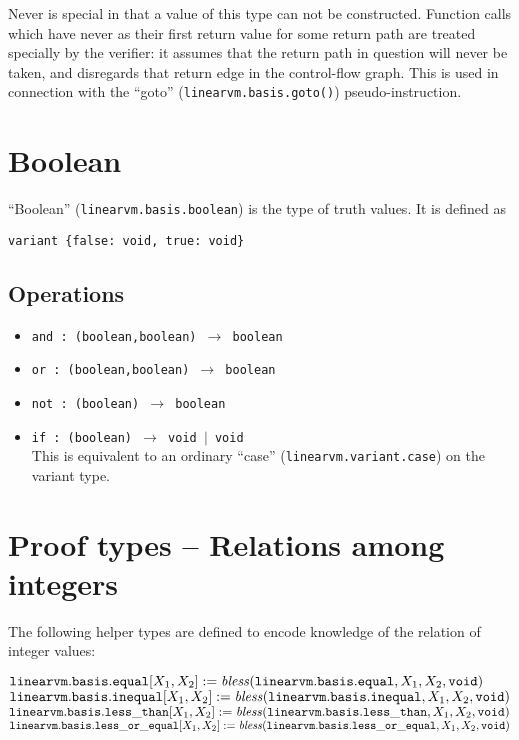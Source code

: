 \documentclass[a4paper]{book}
\newcommand\tyBless{{\ensuremath{\textnormal{\textit{bless}}}}}
\begin{document}
Never is special in that a value of this type can not be constructed.
Function calls which have never as their first return value for some return
path are treated specially by the verifier: it assumes that the return
path in question will never be taken, and disregards that return edge
in the control-flow graph.
This is used in connection with the ``goto'' (\texttt{linearvm.basis.goto()})
pseudo-instruction.

\section{Boolean}
``Boolean'' (\texttt{linearvm.basis.boolean}) is the type of truth values.
It is defined as
\begin{center}
  \verb|variant {false: void, true: void}|
\end{center}

\subsection*{Operations}

\begin{itemize}
\item \texttt{and : (boolean,boolean) $\to$ boolean }
\item \texttt{or : (boolean,boolean) $\to$ boolean }
\item \texttt{not : (boolean) $\to$ boolean }
\item \texttt{if : (boolean) $\to$ void $|$ void }
  \\ This is equivalent to an ordinary ``case''
  (\texttt{linearvm.variant.case}) on the variant type.
\end{itemize}

\section{Proof types -- Relations among integers}

The following helper types are defined to encode knowledge of the relation of
integer values:

\medskip
\noindent
$\mathtt{linearvm.basis.equal}[X_1,X_2] := \tyBless(\mathtt{linearvm.basis.equal}, X_1,X_2, \mathtt{void})$
$\mathtt{linearvm.basis.inequal}[X_1,X_2] := \tyBless(\mathtt{linearvm.basis.inequal}, X_1,X_2, \mathtt{void})$
$\mathtt{linearvm.basis.less\_than}[X_1,X_2] := \tyBless(\mathtt{linearvm.basis.less\_than}, X_1,X_2, \mathtt{void})$
$\mathtt{linearvm.basis.less\_or\_equal}[X_1,X_2] := \tyBless(\mathtt{linearvm.basis.less\_or\_equal}, X_1,X_2, \mathtt{void})$
\end{document}
